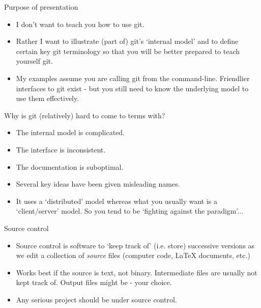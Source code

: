 \documentclass[usenames,dvipsnames]{beamer}
\begin{document}
\begin{frame}{Purpose of presentation}
  \begin{block}{}
    \begin{itemize}
      \item{I don't want to teach you how to use git.}
      \item{Rather I want to illustrate (part of) git's `internal model' and to define certain key git terminology so that you will be better prepared to teach yourself git.}
      \item{My examples assume you are calling git from the command-line. Friendlier interfaces to git exist - but you still need to know the underlying model to use them effectively.}
    \end{itemize}
  \end{block}
\end{frame}


\begin{frame}{Why is git (relatively) hard to come to terms with?}
  \begin{block}{}
    \begin{itemize}
      \item{The internal model is complicated.}
      \item{The interface is inconsistent.}
      \item{The documentation is suboptimal.}
      \item{Several key ideas have been given misleading names.}
      \item{It uses a `distributed' model whereas what you usually want is a `client/server' model. So you tend to be `fighting against the paradigm'...}
    \end{itemize}
  \end{block}
\end{frame}

\begin{frame}{Source control}
  \begin{block}{}
    \begin{itemize}
      \item{Source control is software to `keep track of' (i.e. store) successive versions as we edit a collection of \textit{source} files (computer code, \LaTeX{} documents, etc.)}
      \item{Works best if the source is text, not binary. Intermediate files are usually not kept track of. Output files might be - your choice.}
      \item{Any serious project should be under source control.}
    \end{itemize}
  \end{block}
\end{frame}
\end{document}
